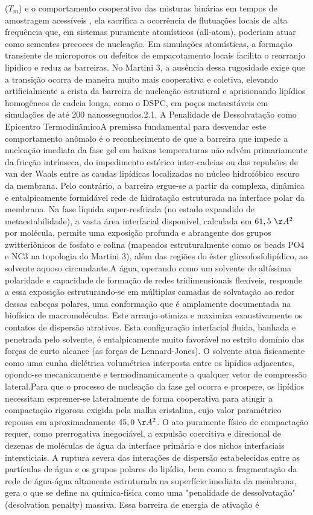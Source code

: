 ($T_m$) e o comportamento cooperativo das misturas binárias em tempos de amostragem acessíveis , ela sacrifica a ocorrência de flutuações locais de alta frequência que, em sistemas puramente atomísticos (all-atom), poderiam atuar como sementes precoces de nucleação. Em simulações atomísticas, a formação transiente de microporos ou defeitos de empacotamento locais facilita o rearranjo lipídico e reduz as barreiras. No Martini 3, a ausência dessa rugosidade exige que a transição ocorra de maneira muito mais cooperativa e coletiva, elevando artificialmente a crista da barreira de nucleação estrutural e aprisionando lipídios homogêneos de cadeia longa, como o DSPC, em poços metaestáveis em simulações de até 200 nanossegundos.2.1. A Penalidade de Dessolvatação como Epicentro TermodinâmicoA premissa fundamental para desvendar este comportamento anômalo é o reconhecimento de que a barreira que impede a nucleação imediata da fase gel em baixas temperaturas não advém primariamente da fricção intrínseca, do impedimento estérico inter-cadeias ou das repulsões de van der Waals entre as caudas lipídicas localizadas no núcleo hidrofóbico escuro da membrana. Pelo contrário, a barreira ergue-se a partir da complexa, dinâmica e entalpicamente formidável rede de hidratação estruturada na interface polar da membrana. Na fase líquida super-resfriada (no estado expandido de metaestabilidade), a vasta área interfacial disponível, calculada em $61,5~\AA^2$ por molécula, permite uma exposição profunda e abrangente dos grupos zwitteriônicos de fosfato e colina (mapeados estruturalmente como os beads PO4 e NC3 na topologia do Martini 3), além das regiões do éster gliceofosfolipídico, ao solvente aquoso circundante.A água, operando como um solvente de altíssima polaridade e capacidade de formação de redes tridimensionais flexíveis, responde a essa exposição estruturando-se em múltiplas camadas de solvatação ao redor dessas cabeças polares, uma conformação que é amplamente documentada na biofísica de macromoléculas. Este arranjo otimiza e maximiza exaustivamente os contatos de dispersão atrativos. Esta configuração interfacial fluida, banhada e penetrada pelo solvente, é entalpicamente muito favorável no estrito domínio das forças de curto alcance (as forças de Lennard-Jones). O solvente atua fisicamente como uma cunha dielétrica volumétrica interposta entre os lipídios adjacentes, opondo-se mecanicamente e termodinamicamente a qualquer vetor de compressão lateral.Para que o processo de nucleação da fase gel ocorra e prospere, os lipídios necessitam espremer-se lateralmente de forma cooperativa para atingir a compactação rigorosa exigida pela malha cristalina, cujo valor paramétrico repousa em aproximadamente $45,0~\AA^2$. O ato puramente físico de compactação requer, como prerrogativa inegociável, a expulsão coercitiva e direcional de dezenas de moléculas de água da interface primária e dos nichos interfaciais intersticiais. A ruptura severa das interações de dispersão estabelecidas entre as partículas de água e os grupos polares do lipídio, bem como a fragmentação da rede de água-água altamente estruturada na superfície imediata da membrana, gera o que se define na química-física como uma "penalidade de dessolvatação" (desolvation penalty) massiva. Essa barreira de energia de ativação é 